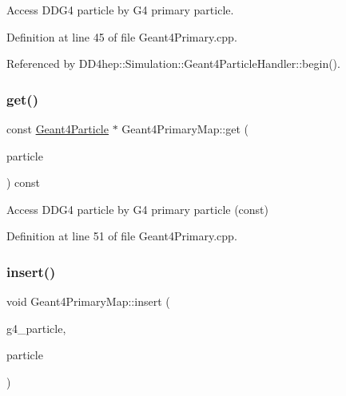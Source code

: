 Access D\+D\+G4 particle by G4 primary particle. 



Definition at line 45 of file Geant4\+Primary.\+cpp.



Referenced by D\+D4hep\+::\+Simulation\+::\+Geant4\+Particle\+Handler\+::begin().

\hypertarget{class_d_d4hep_1_1_simulation_1_1_geant4_primary_map_ad83a5afabaec4155401815c7186da676}{}\label{class_d_d4hep_1_1_simulation_1_1_geant4_primary_map_ad83a5afabaec4155401815c7186da676} 
\subsubsection{\texorpdfstring{get()}{get()}\hspace{0.1cm}{\footnotesize\ttfamily [2/2]}}
{\footnotesize\ttfamily const \hyperlink{class_d_d4hep_1_1_simulation_1_1_geant4_particle}{Geant4\+Particle} $\ast$ Geant4\+Primary\+Map\+::get (\begin{DoxyParamCaption}\item[{const G4\+Primary\+Particle $\ast$}]{particle }\end{DoxyParamCaption}) const}



Access D\+D\+G4 particle by G4 primary particle (const) 



Definition at line 51 of file Geant4\+Primary.\+cpp.

\hypertarget{class_d_d4hep_1_1_simulation_1_1_geant4_primary_map_affe8f0277373092a08624108d677e7f2}{}\label{class_d_d4hep_1_1_simulation_1_1_geant4_primary_map_affe8f0277373092a08624108d677e7f2} 
\subsubsection{\texorpdfstring{insert()}{insert()}}
{\footnotesize\ttfamily void Geant4\+Primary\+Map\+::insert (\begin{DoxyParamCaption}\item[{G4\+Primary\+Particle $\ast$}]{g4\+\_\+particle,  }\item[{\hyperlink{class_d_d4hep_1_1_simulation_1_1_geant4_particle}{Geant4\+Particle} $\ast$}]{particle }\end{DoxyParamCaption})}



